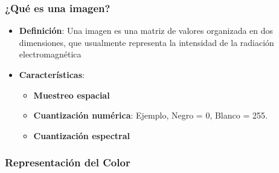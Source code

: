 \subsubsection{¿Qué es una imagen?}

\begin{itemize}
	\item \textbf{Definición}: Una imagen es una matriz de valores organizada en dos dimensiones, que usualmente representa la intensidad de la radiación electromagnética
	\item \textbf{Características}:
	\begin{itemize}
		\item \textbf{Muestreo espacial}
		\item \textbf{Cuantización numérica}: Ejemplo, Negro = 0, Blanco = 255.
		\item \textbf{Cuantización espectral}
	\end{itemize}
\end{itemize}

\subsubsection{Representación del Color}

